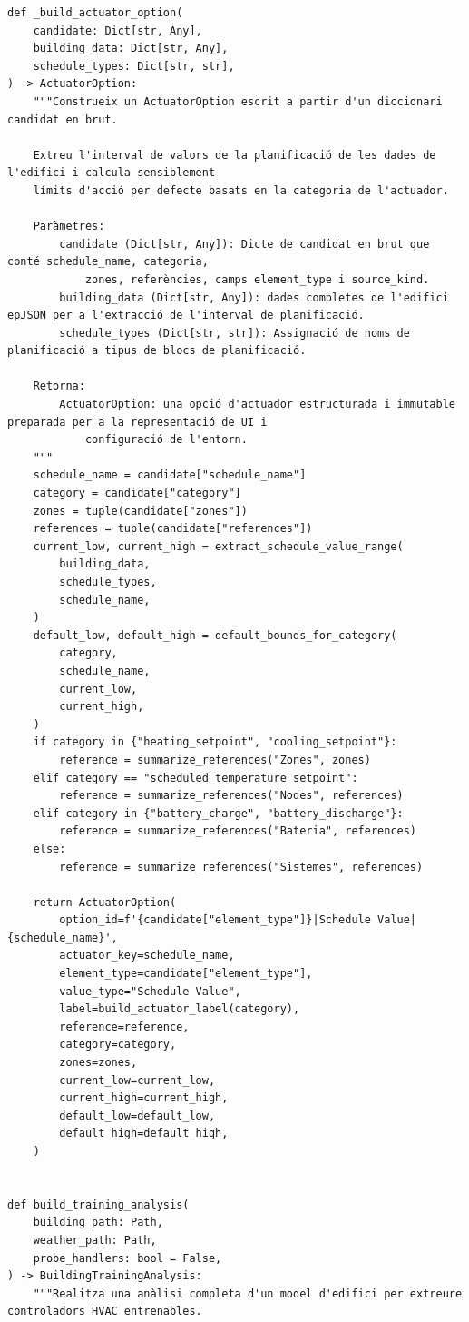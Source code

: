 \documentclass[10pt,a4paper]{article}
\begin{document}
\begin{lstlisting}[style=studioPython,caption={backend/afegir\_entorn\_analysis.py},label={lst:backend-afegir-entorn-analysis-py}]
def _build_actuator_option(
    candidate: Dict[str, Any],
    building_data: Dict[str, Any],
    schedule_types: Dict[str, str],
) -> ActuatorOption:
    """Construeix un ActuatorOption escrit a partir d'un diccionari candidat en brut.

    Extreu l'interval de valors de la planificació de les dades de l'edifici i calcula sensiblement
    límits d'acció per defecte basats en la categoria de l'actuador.

    Paràmetres:
        candidate (Dict[str, Any]): Dicte de candidat en brut que conté schedule_name, categoria,
            zones, referències, camps element_type i source_kind.
        building_data (Dict[str, Any]): dades completes de l'edifici epJSON per a l'extracció de l'interval de planificació.
        schedule_types (Dict[str, str]): Assignació de noms de planificació a tipus de blocs de planificació.

    Retorna:
        ActuatorOption: una opció d'actuador estructurada i immutable preparada per a la representació de UI i
            configuració de l'entorn.
    """
    schedule_name = candidate["schedule_name"]
    category = candidate["category"]
    zones = tuple(candidate["zones"])
    references = tuple(candidate["references"])
    current_low, current_high = extract_schedule_value_range(
        building_data,
        schedule_types,
        schedule_name,
    )
    default_low, default_high = default_bounds_for_category(
        category,
        schedule_name,
        current_low,
        current_high,
    )
    if category in {"heating_setpoint", "cooling_setpoint"}:
        reference = summarize_references("Zones", zones)
    elif category == "scheduled_temperature_setpoint":
        reference = summarize_references("Nodes", references)
    elif category in {"battery_charge", "battery_discharge"}:
        reference = summarize_references("Bateria", references)
    else:
        reference = summarize_references("Sistemes", references)

    return ActuatorOption(
        option_id=f'{candidate["element_type"]}|Schedule Value|{schedule_name}',
        actuator_key=schedule_name,
        element_type=candidate["element_type"],
        value_type="Schedule Value",
        label=build_actuator_label(category),
        reference=reference,
        category=category,
        zones=zones,
        current_low=current_low,
        current_high=current_high,
        default_low=default_low,
        default_high=default_high,
    )


def build_training_analysis(
    building_path: Path,
    weather_path: Path,
    probe_handlers: bool = False,
) -> BuildingTrainingAnalysis:
    """Realitza una anàlisi completa d'un model d'edifici per extreure controladors HVAC entrenables.


\end{lstlisting}
\end{document}
